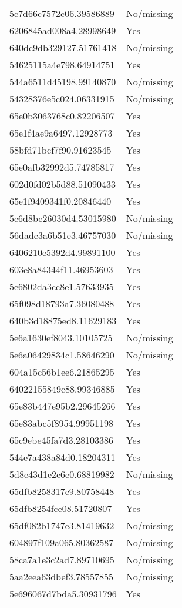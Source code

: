 \begin{tabular}{ll}
5c7d66c7572c06.39586889 & No/missing \\
6206845ad008a4.28998649 & Yes \\
640dc9db329127.51761418 & No/missing \\
54625115a4e798.64914751 & Yes \\
544a6511d45198.99140870 & No/missing \\
54328376e5c024.06331915 & No/missing \\
65e0b3063768c0.82206507 & Yes \\
65e1f4ae9a6497.12928773 & Yes \\
58bfd71bcf7f90.91623545 & Yes \\
65e0afb32992d5.74785817 & Yes \\
602d0fd02b5d88.51090433 & Yes \\
65e1f9409341f0.20846440 & Yes \\
5c6d8bc26030d4.53015980 & No/missing \\
56dadc3a6b51e3.46757030 & No/missing \\
6406210e5392d4.99891100 & Yes \\
603e8a84344f11.46953603 & Yes \\
5e6802da3cc8e1.57633935 & Yes \\
65f098d18793a7.36080488 & Yes \\
640b3d18875ed8.11629183 & Yes \\
5e6a1630ef8043.10105725 & No/missing \\
5e6a06429834c1.58646290 & No/missing \\
604a15c56b1ee6.21865295 & Yes \\
64022155849c88.99346885 & Yes \\
65e83b447e95b2.29645266 & Yes \\
65e83abc5f8954.99951198 & Yes \\
65c9ebe45fa7d3.28103386 & Yes \\
544e7a438a84d0.18204311 & Yes \\
5d8e43d1e2c6e0.68819982 & No/missing \\
65dfb8258317c9.80758448 & Yes \\
65dfb8254fce08.51720807 & Yes \\
65df082b1747e3.81419632 & No/missing \\
604897f109a065.80362587 & No/missing \\
58ca7a1e3c2ad7.89710695 & No/missing \\
5aa2eea63dbef3.78557855 & No/missing \\
5e696067d7bda5.30931796 & Yes \\

\end{tabular}
